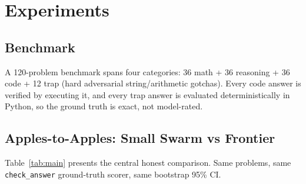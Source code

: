 \documentclass[conference,compsoc]{IEEEtran}
\begin{document}
\section{Experiments}
\subsection{Benchmark}
A 120-problem benchmark spans four categories: 36 math + 36 reasoning + 36 code + 12 trap (hard adversarial string/arithmetic gotchas). Every code answer is verified by executing it, and every trap answer is evaluated deterministically in Python, so the ground truth is exact, not model-rated.

\subsection{Apples-to-Apples: Small Swarm vs Frontier}
Table~\ref{tab:main} presents the central honest comparison. Same problems, same \texttt{check\_answer} ground-truth scorer, same bootstrap 95\% CI.

\begin{table}[htbp]
\centering
\small
\caption{Accuracy across regimes: closed 120, human diverse 40/60, and breaking 100. Bootstrap 95\% CIs in brackets.}
\label{tab:main}
\end{table}
\end{document}
